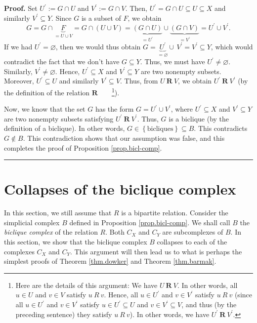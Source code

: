 \documentclass[numbers=enddot,12pt,final,onecolumn,notitlepage]{scrartcl}%
\theoremstyle{definition}
\newenvironment{proof}[1][Proof]{\noindent\textbf{#1.} }{\ \rule{0.5em}{0.5em}}
\newenvironment{verlong}{}{}
\begin{document}
\begin{verlong}
\begin{proof}
Set $U^{\prime}:=G\cap U$ and $V^{\prime}:=G\cap V$. Then, $U^{\prime}=G\cap
U\subseteq U\subseteq X$ and similarly $V^{\prime}\subseteq Y$. Since $G$ is a
subset of $F$, we obtain%
\[
G=G\cap\underbrace{F}_{=U\cup V}=G\cap\left(  U\cup V\right)
=\underbrace{\left(  G\cap U\right)  }_{=U^{\prime}}\cup\underbrace{\left(
G\cap V\right)  }_{=V^{\prime}}=U^{\prime}\cup V^{\prime}.
\]
If we had $U^{\prime}=\varnothing$, then we would thus obtain
$G=\underbrace{U^{\prime}}_{=\varnothing}\cup\,V^{\prime}=V^{\prime}\subseteq
Y$, which would contradict the fact that we don't have $G\subseteq Y$. Thus,
we must have $U^{\prime}\neq\varnothing$. Similarly, $V^{\prime}%
\neq\varnothing$. Hence, $U^{\prime}\subseteq X$ and $V^{\prime}\subseteq Y$
are two nonempty subsets. Moreover, $U^{\prime}\subseteq U$ and similarly
$V^{\prime}\subseteq V$. Thus, from $U\ \mathbf{R}\ V$, we obtain $U^{\prime
}\ \mathbf{R}\ V^{\prime}$ (by the definition of the relation $\mathbf{R}%
$\ \ \ \ \footnote{Here are the details of this argument: We have
$U\ \mathbf{R}\ V$. In other words, all $u\in U$ and $v\in V$ satisfy
$u\ R\ v$. Hence, all $u\in U^{\prime}$ and $v\in V^{\prime}$ satisfy
$u\ R\ v$ (since all $u\in U^{\prime}$ and $v\in V^{\prime}$ satisfy $u\in
U^{\prime}\subseteq U$ and $v\in V^{\prime}\subseteq V$, and thus (by the
preceding sentence) they satisfy $u\ R\ v$). In other words, we have
$U^{\prime}\ \mathbf{R}\ V^{\prime}$.}).

Now, we know that the set $G$ has the form $G=U^{\prime}\cup V^{\prime}$,
where $U^{\prime}\subseteq X$ and $V^{\prime}\subseteq Y$ are two nonempty
subsets satisfying $U^{\prime}\ \mathbf{R}\ V^{\prime}$. Thus, $G$ is a
biclique (by the definition of a biclique). In other words, $G\in\left\{
\text{bicliques}\right\}  \subseteq B$. This contradicts $G\notin B$. This
contradiction shows that our assumption was false, and this completes the
proof of Proposition \ref{prop.bicl-comp}.
\end{proof}
\end{verlong}

\section{Collapses of the biclique complex}

In this section, we still assume that $R$ is a bipartite relation.
Consider the simplicial complex $B$ defined in Proposition
\ref{prop.bicl-comp}.
We shall call $B$ the \emph{biclique complex} of the relation $R$.
Both $C_{X}$ and $C_{Y}$ are subcomplexes of $B$.
In this section, we show that the biclique complex $B$
collapses to each of the complexes $C_{X}$ and $C_{Y}$.
This argument will then lead us to what is perhaps the simplest
proofs of Theorem \ref{thm.dowker} and Theorem \ref{thm.barmak}.
\end{document}
